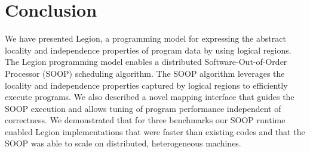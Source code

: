 \section{Conclusion}
\label{sec:conc}

We have presented Legion, a programming model for expressing
the abstract locality and independence properties of program
data by using logical regions.  The Legion programming model enables 
a distributed Software-Out-of-Order Processor (SOOP) scheduling 
algorithm.  The SOOP algorithm leverages the locality and independence properties
captured by logical regions to efficiently execute programs.  We also
described a novel mapping interface that guides the SOOP execution
and allows tuning of program performance independent of correctness.
We demonstrated that for three benchmarks our SOOP runtime 
enabled Legion implementations that were faster than existing codes
and that the SOOP was able to scale on distributed, heterogeneous machines.


